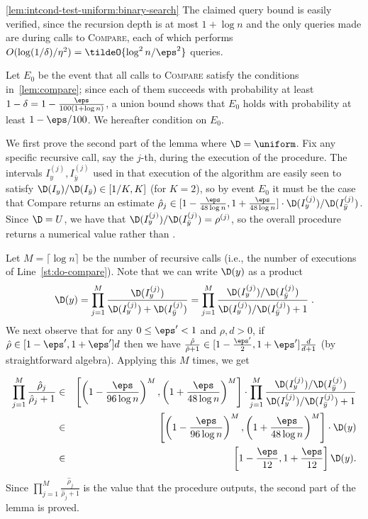 \begin{proofof}{\cref{lem:intcond-test-uniform:binary-search}}
The claimed query bound is easily verified, since the
recursion depth is at most $1 + \log n$
and the only queries made  are  during calls to
\textsc{Compare}, each of which performs
$O(\log(1/\delta)/\eta^2)=\tildeO{ \log^2 n/\eps^2 }$ queries.

  \noindent Let $E_0$ be the event that all calls to \textsc{Compare}
satisfy the conditions in~\cref{lem:compare}; since each of them
succeeds with probability at least $1-\delta=1-{\frac {\eps}{100 (1 + \log n)}}$, a union
bound shows that $E_0$ holds with probability at least $1-\eps/100$.
We hereafter condition on $E_0$.


We first prove the second part of the lemma where $\D = \uniform$.
Fix any specific recursive call, say the $j$-th, during the
execution of the procedure.
The intervals $I^{(j)}_y,I^{(j)}_{\bar{y}}$ used in that execution of the
algorithm are easily seen to satisfy $\D(I_y)/\D(I_{\bar{y}})\in[1/K,K]$
(for $K=2$), so by event $E_0$ it must be the case that {\sc Compare} returns an estimate
\mbox{$\hat{\rho}_{j}\in[1-\frac{\eps}{48\log n}, 1+\frac{\eps}{48\log n}]\cdot\D(I^{(j)}_y)/\D(I^{(j)}_{\bar{y}})$}.
Since
$\D = U$, we have that $\D(I^{(j)}_y)/\D(I^{(j)}_{\bar{y}}) = \rho^{(j)}$,
so the overall procedure returns a numerical value
rather than \reject.

Let $M = \lceil \log n \rceil$
be the number of recursive calls (i.e., the number of executions
of Line~\ref{st:do-compare}).
Note that we can write
$\D(y)$ as a product
\begin{equation} \label{eq:Dy}
\D(y) = \prod_{j=1}^{M} \frac{ \D(I^{(j)}_y) }{ \D(I^{(j)}_y) + \D(I^{(j)}_{\bar{y}}) }
      = \prod_{j=1}^{M} \frac{\D(I^{(j)}_y)/\D(I^{(j)}_{\bar{y}})}{\D(I^{(j)}_y)/\D(I^{(j)}_{\bar{y}})+1}\;.
\end{equation}
We next observe that for any
$0 \leq \eps' < 1$ and $\rho,d>0$, if
$\hat{\rho} \in [1-\eps',1+\eps']d$ then we have
${\frac {\hat{\rho}}{\hat{\rho}+1}} \in [1-{\frac {\eps'}2},1+\eps']
{\frac {d}{d+ 1}}$
(by straightforward algebra).
Applying this $M$ times, we get

\begin{eqnarray*}
\prod_{j=1}^{M} \frac{\hat{\rho}_{j}}{\hat{\rho}_{j}+1}
&\in&\left[\left(1-\frac{\eps}{96\log n}\right)^M,
\left(1+\frac{\eps}{48\log n}\right)^M\right]\cdot
\prod_{j=1}^{M}
\frac{\D(I^{(j)}_y)/\D(I^{(j)}_{\bar{y}})}{\D(I^{(j)}_y)/\D(I^{(j)}_{\bar{y}})+1}\\
&\in&
\left[\left(1-\frac{\eps}{96\log n}\right)^M,
\left(1+\frac{\eps}{48\log n}\right)^M\right]\cdot
\D(y)\\
&\in&
\left[1 - {\frac{\eps}{12}}, 1 + {\frac{\eps}{12}} \right]
\D(y).
\end{eqnarray*}
Since
$\prod_{j=1}^{M} \frac{\hat{\rho}_{j}}{\hat{\rho}_{j}+1}$ is the value that
the procedure outputs, the second part of the lemma is proved.


\end{proofof}

